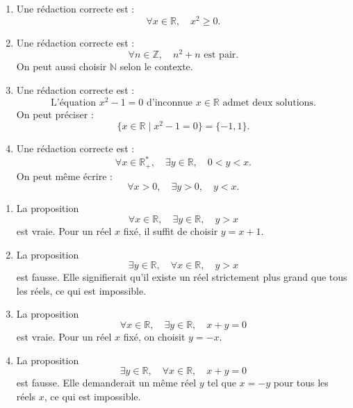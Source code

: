 \documentclass[11pt,a4paper]{article}
\begin{document}
\begin{preuvebox}[title={Correction de l'exercice 2}]

\begin{enumerate}
    \item Une rédaction correcte est :
    \[
    \forall x\in\mathbb{R},\quad x^2\geq 0.
    \]

    \item Une rédaction correcte est :
    \[
    \forall n\in\mathbb{Z},\quad n^2+n \text{ est pair}.
    \]
    On peut aussi choisir $\mathbb{N}$ selon le contexte.

    \item Une rédaction correcte est :
    \[
    \text{L'équation } x^2-1=0 \text{ d'inconnue } x\in\mathbb{R} \text{ admet deux solutions.}
    \]
    On peut préciser :
    \[
    \{x\in\mathbb{R}\mid x^2-1=0\}=\{-1,1\}.
    \]

    \item Une rédaction correcte est :
    \[
    \forall x\in\mathbb{R}_+^*,\quad \exists y\in\mathbb{R},\quad 0<y<x.
    \]
    On peut même écrire :
    \[
    \forall x>0,\quad \exists y>0,\quad y<x.
    \]
\end{enumerate}

\end{preuvebox}

\begin{preuvebox}[title={Correction de l'exercice 3}]

\begin{enumerate}
    \item La proposition
    \[
    \forall x\in\mathbb{R},\quad \exists y\in\mathbb{R},\quad y>x
    \]
    est vraie. Pour un réel $x$ fixé, il suffit de choisir $y=x+1$.

    \item La proposition
    \[
    \exists y\in\mathbb{R},\quad \forall x\in\mathbb{R},\quad y>x
    \]
    est fausse. Elle signifierait qu'il existe un réel strictement plus grand que tous les réels, ce qui est impossible.

    \item La proposition
    \[
    \forall x\in\mathbb{R},\quad \exists y\in\mathbb{R},\quad x+y=0
    \]
    est vraie. Pour un réel $x$ fixé, on choisit $y=-x$.

    \item La proposition
    \[
    \exists y\in\mathbb{R},\quad \forall x\in\mathbb{R},\quad x+y=0
    \]
    est fausse. Elle demanderait un même réel $y$ tel que $x=-y$ pour tous les réels $x$, ce qui est impossible.
\end{enumerate}

\end{preuvebox}
\end{document}
